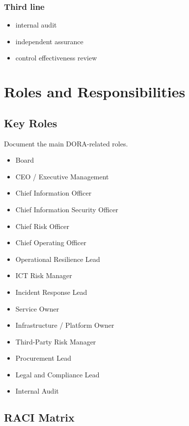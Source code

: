 \documentclass[
  letterpaper,
  DIV=11,
  numbers=noendperiod]{scrartcl}
\providecommand{\tightlist}{%
  \setlength{\itemsep}{0pt}\setlength{\parskip}{0pt}}
\begin{document}
\subsubsection{Third line}\label{third-line}

\begin{itemize}
\tightlist
\item
  internal audit
\item
  independent assurance
\item
  control effectiveness review
\end{itemize}

\section{Roles and Responsibilities}\label{roles-and-responsibilities}

\subsection{Key Roles}\label{key-roles}

Document the main DORA-related roles.

\begin{itemize}
\tightlist
\item
  Board
\item
  CEO / Executive Management
\item
  Chief Information Officer
\item
  Chief Information Security Officer
\item
  Chief Risk Officer
\item
  Chief Operating Officer
\item
  Operational Resilience Lead
\item
  ICT Risk Manager
\item
  Incident Response Lead
\item
  Service Owner
\item
  Infrastructure / Platform Owner
\item
  Third-Party Risk Manager
\item
  Procurement Lead
\item
  Legal and Compliance Lead
\item
  Internal Audit
\end{itemize}

\subsection{RACI Matrix}\label{raci-matrix}
\end{document}
